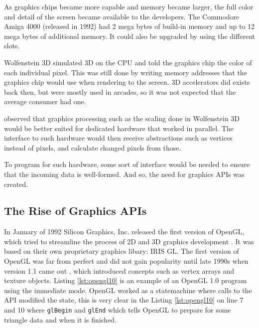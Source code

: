 As graphics chips became more capable and memory became larger, the full color and detail of the screen became available to the developers.
The Commodore Amiga 4000 (released in 1992) had 2 mega bytes of build-in memory and up to 12 mega bytes of additional memory.
It could also be upgraded by using the different slots.

Wolfenstein 3D simulated 3D on the \gls{CPU} and told the graphics chip the color of each individual pixel.
This was still done by writing memory addresses that the graphics chip would use when rendering to the screen.
3D accelerators did exists back then, but were mostly used in arcades, so it was not expected that the average consumer had one.

 observed that graphics processing such as the scaling done in Wolfenstein 3D would be better suited for dedicated hardware that worked in parallel. 
The interface to such hardware would then receive abstractions such as vertices instead of pixels, and calculate changed pixels from those.

To program for such hardware, some sort of interface would be needed to ensure that the incoming data is well-formed.
And so, the need for graphics \glspl{API} was created.


\subsection{The Rise of Graphics \acs{API}s} 

In January of 1992 Silicon Graphics, Inc. released the first version of OpenGL, which tried to streamline the process of 2D and 3D graphics development \cite{segal1994opengl}.
It was based on their own proprietary graphics libary: \gls{IRIS GL}.
The first version of OpenGL was far from perfect and did not gain popularity until late 1990s when version 1.1 came out \cite{kronos????history}, which introduced concepts such as vertex arrays and texture objects.
Listing \ref{lst:opengl10} is an example of an OpenGL 1.0 program using the immediate mode.
OpenGL worked as a statemachine where calls to the \gls{API} modified the state, this is very clear in the Listing \ref{lst:opengl10} on line 7 and 10 where \texttt{glBegin} and \texttt{glEnd} which tells OpenGL to prepare for some triangle data and when it is finished.

